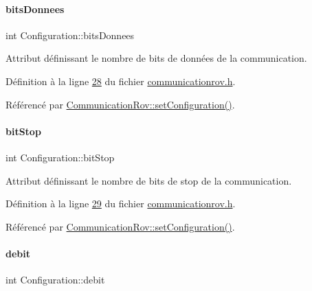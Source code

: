 \paragraph{\texorpdfstring{bits\+Donnees}{bitsDonnees}}
{\footnotesize\ttfamily int Configuration\+::bits\+Donnees}



Attribut définissant le nombre de bits de données de la communication. 



Définition à la ligne \hyperlink{communicationrov_8h_source_l00028}{28} du fichier \hyperlink{communicationrov_8h_source}{communicationrov.\+h}.



Référencé par \hyperlink{communicationrov_8cpp_source_l00050}{Communication\+Rov\+::set\+Configuration()}.

\mbox{\label{struct_configuration_a9c24ff9a3e5a24b14e1ac8bc03de907d}} 
\paragraph{\texorpdfstring{bit\+Stop}{bitStop}}
{\footnotesize\ttfamily int Configuration\+::bit\+Stop}



Attribut définissant le nombre de bits de stop de la communication. 



Définition à la ligne \hyperlink{communicationrov_8h_source_l00029}{29} du fichier \hyperlink{communicationrov_8h_source}{communicationrov.\+h}.



Référencé par \hyperlink{communicationrov_8cpp_source_l00050}{Communication\+Rov\+::set\+Configuration()}.

\mbox{\label{struct_configuration_ab714d6036189bf451e566e6c6a971c85}} 
\paragraph{\texorpdfstring{debit}{debit}}
{\footnotesize\ttfamily int Configuration\+::debit}



